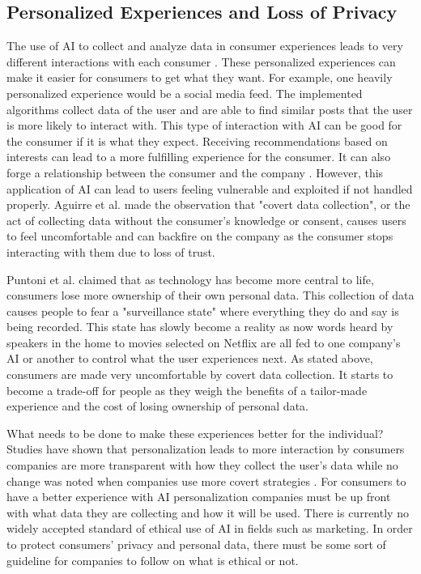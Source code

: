 \documentclass[12pt, man]{apa6}
\begin{document}
\subsection*{Personalized Experiences and Loss of Privacy}
The use of AI to collect and analyze data in consumer experiences leads to very different interactions with each consumer \parencite{Puntoni2021}.  These personalized experiences can make it easier for consumers to get what they want.  For example, one heavily personalized experience would be a social media feed.  The implemented algorithms collect data of the user and are able to find similar posts that the user is more likely to interact with.
This type of interaction with AI can be good for the consumer if it is what they expect.  Receiving recommendations based on interests can lead to a more fulfilling experience for the consumer.  It can also forge a relationship between the consumer and the company \parencite{Kumar2019}.  However, this application of AI can lead to users feeling vulnerable and exploited if not handled properly.  Aguirre et al. \parencite*{Aguirre2015} made the observation that "covert data collection", or the act of collecting data without the consumer's knowledge or consent, causes users to feel uncomfortable and can backfire on the company as the consumer stops interacting with them due to loss of trust.

Puntoni et al. \parencite*{Puntoni2021} claimed that as technology has become more central to life, consumers lose more ownership of their own personal data. This collection of data causes people to fear a "surveillance state" where everything they do and say is being recorded.  This state has slowly become a reality as now words heard by speakers in the home to movies selected on Netflix are all fed to one company's AI or another to control what the user experiences next. As stated above, consumers are made very uncomfortable by covert data collection.  It starts to become a trade-off for people as they weigh the benefits of a tailor-made experience and the cost of losing ownership of personal data.

What needs to be done to make these experiences better for the individual?  Studies have shown that personalization leads to more interaction by consumers companies are more transparent with how they collect the user's data while no change was noted when companies use more covert strategies \parencite{Aguirre2015}.  For consumers to have a better experience with AI personalization companies must be up front with what data they are collecting and how it will be used.  There is currently no widely accepted standard of ethical use of AI in fields such as marketing\parencite{Puntoni2021}.  In order to protect consumers' privacy and personal data, there must be some sort of guideline for companies to follow on what is ethical or not.
\end{document}
